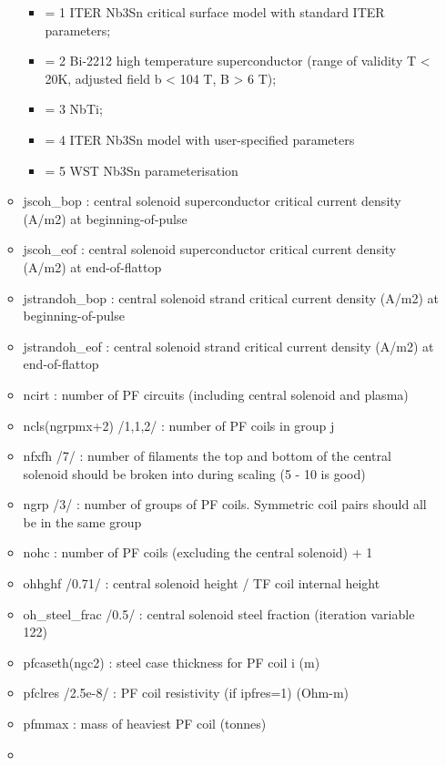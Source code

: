 \documentclass[]{article}
\providecommand{\tightlist}{%
  \setlength{\itemsep}{0pt}\setlength{\parskip}{0pt}}
\begin{document}
\begin{itemize}
\begin{itemize}
    \begin{itemize}
    \tightlist
    \item
      = 1 ITER Nb3Sn critical surface model with standard ITER
      parameters;
    \item
      = 2 Bi-2212 high temperature superconductor (range of validity T
      \textless{} 20K, adjusted field b \textless{} 104 T, B
      \textgreater{} 6 T);
    \item
      = 3 NbTi;
    \item
      = 4 ITER Nb3Sn model with user-specified parameters
    \item
      = 5 WST Nb3Sn parameterisation
    \end{itemize}
  \item
    jscoh\_bop : central solenoid superconductor critical current
    density (A/m2) at beginning-of-pulse
  \item
    jscoh\_eof : central solenoid superconductor critical current
    density (A/m2) at end-of-flattop
  \item
    jstrandoh\_bop : central solenoid strand critical current density
    (A/m2) at beginning-of-pulse
  \item
    jstrandoh\_eof : central solenoid strand critical current density
    (A/m2) at end-of-flattop
  \item
    ncirt : number of PF circuits (including central solenoid and
    plasma)
  \item
    ncls(ngrpmx+2) /1,1,2/ : number of PF coils in group j
  \item
    nfxfh /7/ : number of filaments the top and bottom of the central
    solenoid should be broken into during scaling (5 - 10 is good)
  \item
    ngrp /3/ : number of groups of PF coils. Symmetric coil pairs should
    all be in the same group
  \item
    nohc : number of PF coils (excluding the central solenoid) + 1
  \item
    ohhghf /0.71/ : central solenoid height / TF coil internal height
  \item
    oh\_steel\_frac /0.5/ : central solenoid steel fraction (iteration
    variable 122)
  \item
    pfcaseth(ngc2) : steel case thickness for PF coil i (m)
  \item
    pfclres /2.5e-8/ : PF coil resistivity (if ipfres=1) (Ohm-m)
  \item
    pfmmax : mass of heaviest PF coil (tonnes)
  \item

\end{itemize}
\end{itemize}
\end{document}
